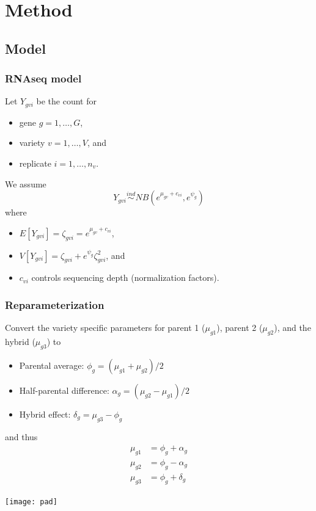 \documentclass[handout]{beamer}\usepackage[]{graphicx}\usepackage[]{color}
\begin{document}
\section{Method}
\subsection{Model}

\begin{frame}
\frametitle{RNAseq model}

Let $Y_{gvi}$ be the count for 
\begin{itemize}
\item gene $g=1,\ldots,G$, 
\item variety $v=1,\ldots,V$, and 
\item replicate $i=1,\ldots,n_v$. 
\end{itemize}

\vspace{0.2in} \pause

We assume
\[
Y_{gvi} \stackrel{ind}{\sim} NB\left(e^{\mu_{gv}+c_{vi}},e^{\psi_g}\right) 
\]
\pause
where 
\begin{itemize}
\item $E[Y_{gvi}] = \zeta_{gvi} = e^{\mu_{gv}+c_{vi}}$, \pause 
\item $V[Y_{gvi}] = \zeta_{gvi}+e^{\psi_g}\zeta_{gvi}^2$, \pause and 
\item $c_{vi}$ controls sequencing depth (normalization factors).
\end{itemize}
\end{frame}


\begin{frame}
\frametitle{Reparameterization}

Convert the variety specific parameters for parent 1 ($\mu_{g1}$), parent 2 ($\mu_{g2}$), and the hybrid ($\mu_{g3}$) \pause to 

\begin{itemize}[<+->]
\item Parental average: $\phi_g = (\mu_{g1}+\mu_{g2})/2$
\item Half-parental difference: $\alpha_g = (\mu_{g2}-\mu_{g1})/2$
\item Hybrid effect: $\delta_g = \mu_{g3}-\phi_g$
\end{itemize}

\vspace{0.2in} \pause

and thus 
\[ \begin{array}{rl}
\mu_{g1} &= \phi_g + \alpha_g \\
\mu_{g2} &= \phi_g - \alpha_g \\
\mu_{g3} &= \phi_g + \delta_g
\end{array}\]

\pause
\begin{center}
\texttt{[image: pad]}
\end{center}

\end{frame}
\end{document}
